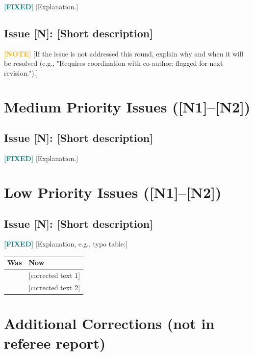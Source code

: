 \documentclass[11pt]{article}
\newcommand{\fixed}{\textcolor{teal}{\textbf{[FIXED]}}}
\newcommand{\noted}{\textcolor{orange}{\textbf{[NOTE]}}}
\begin{document}
\fixed{} [Explanation.]

\subsection*{Issue [N]: [Short description]}

\noted{} [If the issue is not addressed this round, explain why and when
it will be resolved (e.g., "Requires coordination with co-author; flagged for next revision.").]

\section*{Medium Priority Issues ([N1]--[N2])}

\subsection*{Issue [N]: [Short description]}

\fixed{} [Explanation.]

\section*{Low Priority Issues ([N1]--[N2])}

\subsection*{Issue [N]: [Short description]}

\fixed{} [Explanation, e.g., typo table:]

\begin{center}
\begin{tabular}{ll}
\hline\hline
\textbf{Was} & \textbf{Now} \\
\hline
[old text 1] & [corrected text 1] \\
[old text 2] & [corrected text 2] \\
\hline\hline
\end{tabular}
\end{center}

\section*{Additional Corrections (not in referee report)}
\end{document}
